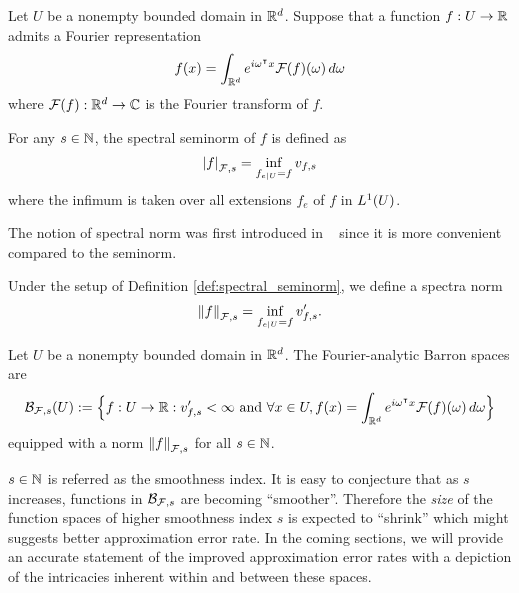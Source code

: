 \begin{definition}
    \label{def:spectral_seminorm}
    Let $U$ be a nonempty bounded domain in $\mathbb{R}^d$. Suppose that a function $f:
    U \to \mathbb{R}$ admits a Fourier representation
    \begin{equation}
        f(x) = \int_{\mathbb{R}^d} e^{i\omega{}^{\intercal} x} \mathcal{F}(f)(\omega) \,d\omega
    \end{equation}
    where $\mathcal{F}(f): \mathbb{R}^d \to \mathbb{C}$ is the Fourier transform of $f$.

    For any $s \in \mathbb{N}$, the spectral seminorm of $f$ is defined as
    \begin{equation}
        \left| f \right|_{\mathcal{F}, {s}} = \inf_{f_{e\mid U} = f} v_{f,s}
    \end{equation}
    where the infimum is taken over all extensions $f_e$ of $f$ in $L^{1}(U)$.
\end{definition}


The notion of spectral norm was first introduced in
~\cite{siegelApproximationRatesNeural2021} since it is more convenient compared
to the seminorm.

\begin{definition}
    \label{def:spectral_norm}
    Under the setup of Definition \ref{def:spectral_seminorm}, we define a
    spectra norm
    \begin{equation}
        \left\| f \right\|_{\mathcal{F}, {s}} = \inf_{f_{e\mid U} = f} v'_{f,s}.
    \end{equation}
\end{definition}

\begin{definition}
    \label{def:fourier_space}
    Let $U$ be a nonempty bounded domain in $\mathbb{R}^d$. The Fourier-analytic Barron
    spaces are
    \begin{equation}
        \mathcal{B}_{\mathcal{F},s}(U) := \Big\{
            f: U \to \mathbb{R}: v'_{f,s} < \infty  \textnormal{ and }
            \forall x\in U, 
                f(x) = \int_{\mathbb{R}^d} e^{i\omega{}^{\intercal} x} \mathcal{F}(f)(\omega)\,d\omega
        \Big\}
    \end{equation}
    equipped with a norm $\left\| f \right\|_{\mathcal{F}, {s}}$ for all $s \in \mathbb{N}$.
\end{definition}



$s \in \mathbb{N}$ is referred as the smoothness index. It is easy to conjecture
that as $s$ increases, functions in $\mathcal{B}_{\mathcal{F}, s}$ are becoming
``smoother''. Therefore the \textit{size} of the function spaces of higher
smoothness index $s$ is expected to ``shrink'' which might suggests better
approximation error rate. In the coming sections, we will provide an accurate
statement of the improved approximation error rates with a depiction of the
intricacies inherent within and between these spaces.

